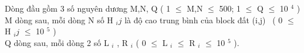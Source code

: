 Dòng đầu gồm 3 số nguyên dương M,N, Q ( 1  $\le$  M,N  $\le$  500; 1  $\le$  Q  $\le$  10 $^ 4 $ )
\\M dòng sau, mỗi dòng N số H $_ ij $ là độ cao trung bình của block đất (i,j)  ( 0  $\le$  H $_ ij $  $\le$  10 $^ 5 $ )
\\Q dòng sau, mỗi dòng 2 số L $_ i $ , R $_ i $ ( 0  $\le$  L $_ i $  $\le$  R $_ i $  $\le$  10 $^ 5 $ ).

\